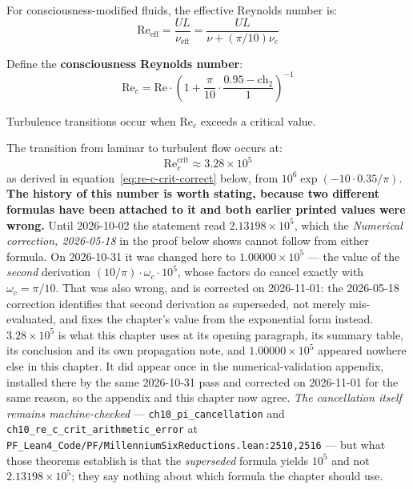 For consciousness-modified fluids, the effective Reynolds number is:
\begin{equation}
\text{Re}_{\text{eff}} = \frac{UL}{\nu_{\text{eff}}} = \frac{UL}{\nu + (\pi/10)\nu_c}
\end{equation}

\begin{definition}
\label{def:consciousness_reynolds}
Define the \textbf{consciousness Reynolds number}:
\begin{equation}
\text{Re}_c = \text{Re} \cdot \left(1 + \frac{\pi}{10} \cdot \frac{0.95 - \text{ch}_2}{1}\right)^{-1}
\end{equation}
\end{definition}

Turbulence transitions occur when $\text{Re}_c$ exceeds a critical value.

\begin{theorem}
\label{thm:critical_reynolds}
The transition from laminar to turbulent flow occurs at:
\begin{equation}
\text{Re}_c^{\text{crit}} \approx 3.28 \times 10^5
\end{equation}
as derived in equation~\eqref{eq:re-c-crit-correct} below, from
$10^6 \exp(-10 \cdot 0.35/\pi)$. \textbf{The history of this number is worth
stating, because two different formulas have been attached to it and both
earlier printed values were wrong.} Until 2026-10-02 the statement read
$2.13198 \times 10^5$, which the \emph{Numerical correction, 2026-05-18} in the
proof below shows cannot follow from either formula. On 2026-10-31 it was
changed here to $1.00000 \times 10^5$ --- the value of the \emph{second}
derivation $(10/\pi)\cdot\omega_c\cdot10^5$, whose factors do cancel exactly
with $\omega_c = \pi/10$. That was also wrong, and is corrected on 2026-11-01:
the 2026-05-18 correction identifies that second derivation as superseded, not
merely mis-evaluated, and fixes the chapter's value from the exponential form
instead. $3.28 \times 10^5$ is what this chapter uses at its opening paragraph,
its summary table, its conclusion and its own propagation note, and
$1.00000 \times 10^5$ appeared nowhere else in this chapter. It did appear
once in the numerical-validation appendix, installed there by the same
2026-10-31 pass and corrected on 2026-11-01 for the same reason, so the appendix
and this chapter now agree. \emph{The cancellation itself
remains machine-checked} --- \texttt{ch10\_pi\_cancellation} and
\texttt{ch10\_re\_c\_crit\_arithmetic\_error} at
\texttt{PF\_Lean4\_Code/PF/MillenniumSixReductions.lean:2510,2516} --- but what
those theorems establish is that the \emph{superseded} formula yields $10^5$ and
not $2.13198\times10^5$; they say nothing about which formula the chapter should
use.
\end{theorem}

